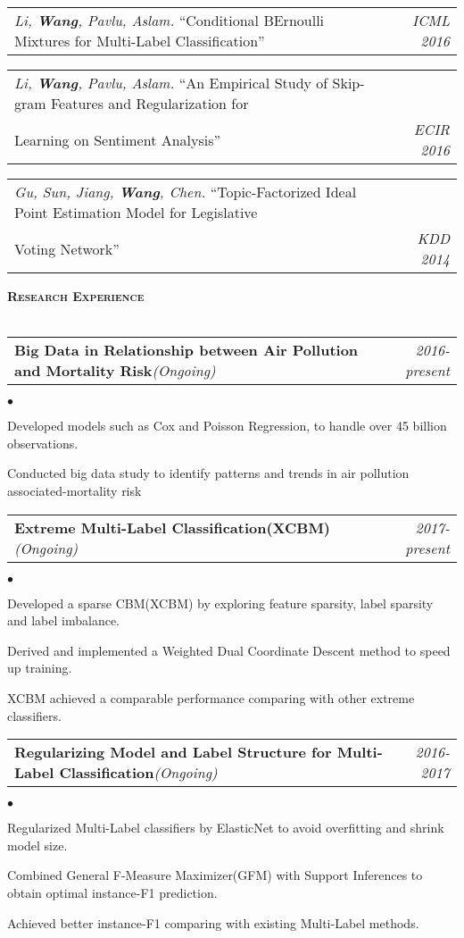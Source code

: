 \documentclass[11pt]{article}
\makeatletter
\newcommand{\lineunder}{\vspace*{-8pt} \\ \hspace*{-18pt} \hrulefill \\}
\newcommand{\header}[1]{{\hspace*{-15pt}\vspace*{6pt} \large \textsc{\textbf{#1}}} \vspace*{-6pt} \lineunder}
\newenvironment{achievements}{\begin{list}{$\bullet$}{\topsep 0pt \itemsep -2pt}}{\vspace*{4pt}\end{list}}
\newcommand{\headerrow}[2]
{\begin{tabular*}{\linewidth}{l@{\extracolsep{\fill}}r}
	\hspace*{-15pt}#1 & #2 \\
\end{tabular*}}
\newcommand{\headerrowww}[1]
{\begin{tabular*}{\linewidth}{l@{\extracolsep{\fill}}r}
	#1 &\\
\end{tabular*}}
\makeatother
\begin{document}
\headerrow
{\textit{Li, \textbf{Wang}, Pavlu, Aslam.} ``Conditional BErnoulli Mixtures for Multi-Label Classification''}
{\emph{ICML 2016}}

\headerrow
{\textit{Li, \textbf{Wang}, Pavlu, Aslam.} ``An Empirical Study of Skip-gram Features and Regularization for \\Learning on Sentiment Analysis''}
{\emph{ECIR 2016}}

\headerrow
{\textit{Gu, Sun, Jiang, \textbf{Wang}, Chen.} ``Topic-Factorized Ideal Point Estimation Model for Legislative \\ Voting Network''}
{\emph{KDD 2014}}


\vspace*{1.5pt}
\header{Research Experience}

\headerrow
{\textbf{Big Data in Relationship between Air Pollution and Mortality Risk}\emph{(Ongoing)}}
{\emph{2016-present}}
\begin{achievements}
	\item Developed models such as Cox and Poisson Regression, to handle over 45 billion observations.
	\item Conducted big data study to identify patterns and trends in air pollution associated-mortality risk
\end{achievements}

\headerrow
{\textbf{Extreme Multi-Label Classification(XCBM)}\emph{(Ongoing)}}
{\emph{2017-present}}
\begin{achievements}
	\item Developed a sparse CBM(XCBM) by exploring feature sparsity, label sparsity and label imbalance. 
	\item Derived and implemented a Weighted Dual Coordinate Descent method to speed up training.
	\item XCBM achieved a comparable performance comparing with other extreme classifiers.
\end{achievements}

\headerrow
{\textbf{Regularizing Model and Label Structure for Multi-Label Classification}\emph{(Ongoing)}}
{\emph{2016-2017}}
\begin{achievements}
	\item Regularized Multi-Label classifiers by ElasticNet to avoid overfitting and shrink model size.
	\item Combined General F-Measure Maximizer(GFM) with Support Inferences to obtain optimal instance-F1 prediction.
	\item Achieved better instance-F1 comparing with existing Multi-Label methods. 
\end{achievements}
\end{document}
